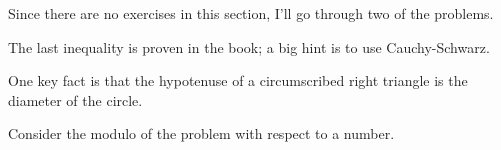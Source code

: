 Since there are no exercises in this section, I'll go through two of the problems. 

\begin{Exercise}
	The last inequality is proven in the book; a big hint is to use Cauchy-Schwarz.
\end{Exercise}

\begin{Exercise}
	One key fact is that the hypotenuse of a circumscribed right triangle is the diameter of the circle.
\end{Exercise}

\begin{Exercise}
	Consider the modulo of the problem with respect to a number.
\end{Exercise}